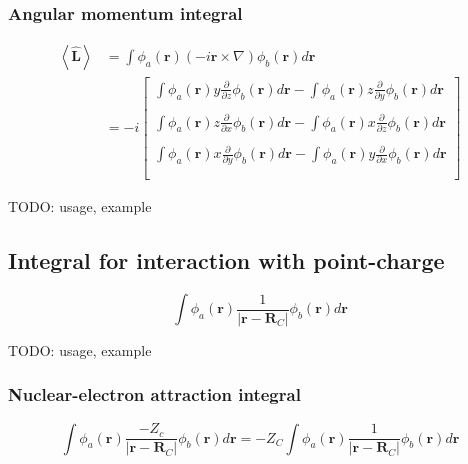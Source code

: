 \documentclass[letterpaper]{article}
\begin{document}
\subsubsection{Angular momentum integral}
\begin{equation}
  \label{eq:angular_momentum}
  \begin{split}
    \left< \hat{\mathbf{L}} \right>
    &= \int \phi_a(\mathbf{r}) \left( -i \mathbf{r} \times \nabla \right) \phi_b(\mathbf{r}) d\mathbf{r}\\
    &= -i
    \begin{bmatrix}
      \int \phi_a(\mathbf{r}) y\frac{\partial}{\partial z} \phi_b(\mathbf{r}) d\mathbf{r}
      - \int \phi_a(\mathbf{r}) z\frac{\partial}{\partial y} \phi_b(\mathbf{r}) d\mathbf{r}\\\\
      \int \phi_a(\mathbf{r}) z\frac{\partial}{\partial x} \phi_b(\mathbf{r}) d\mathbf{r}
      - \int \phi_a(\mathbf{r}) x\frac{\partial}{\partial z} \phi_b(\mathbf{r}) d\mathbf{r}\\\\
      \int \phi_a(\mathbf{r}) x\frac{\partial}{\partial y} \phi_b(\mathbf{r}) d\mathbf{r}
      - \int \phi_a(\mathbf{r}) y\frac{\partial}{\partial x} \phi_b(\mathbf{r}) d\mathbf{r}\\\\
    \end{bmatrix}
  \end{split}
\end{equation}

TODO: usage, example
\subsection{Integral for interaction with point-charge}
\begin{equation}
  \label{eq:point_charge}
  \int \phi_a(\mathbf{r}) \frac{1}{|\mathbf{r} - \mathbf{R}_C|} \phi_b(\mathbf{r}) d\mathbf{r}
\end{equation}

TODO: usage, example
\subsubsection{Nuclear-electron attraction integral}
\begin{equation}
  \label{eq:nuclear_electron_attraction}
  \int \phi_a(\mathbf{r}) \frac{-Z_c}{|\mathbf{r} - \mathbf{R}_C|} \phi_b(\mathbf{r}) d\mathbf{r}
  =
  -Z_C \int \phi_a(\mathbf{r}) \frac{1}{|\mathbf{r} - \mathbf{R}_C|} \phi_b(\mathbf{r}) d\mathbf{r}
\end{equation}
\end{document}
